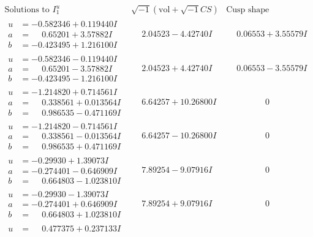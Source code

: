 \documentclass[1p]{elsarticle_modified}
\theoremstyle{definition}
\newcommand{\I}{\sqrt{-1}}
\begin{document}
$$\begin{array}{c|c|c}
\text{Solutions to }I^u_{1}& \I (\text{vol} + \sqrt{-1}CS) & \text{Cusp shape}\\
 \hline 
\begin{aligned}
u &= -0.582346 + 0.119440 I \\
a &= \phantom{-}0.65201 + 3.57882 I \\
b &= -0.423495 + 1.216100 I\end{aligned}
 & \phantom{-}2.04523 - 4.42740 I & \phantom{-}0.06553 + 3.55579 I \\ \hline\begin{aligned}
u &= -0.582346 - 0.119440 I \\
a &= \phantom{-}0.65201 - 3.57882 I \\
b &= -0.423495 - 1.216100 I\end{aligned}
 & \phantom{-}2.04523 + 4.42740 I & \phantom{-}0.06553 - 3.55579 I \\ \hline\begin{aligned}
u &= -1.214820 + 0.714561 I \\
a &= \phantom{-}0.338561 + 0.013564 I \\
b &= \phantom{-}0.986535 - 0.471169 I\end{aligned}
 & \phantom{-}6.64257 + 10.26800 I & \phantom{-0.000000 } 0 \\ \hline\begin{aligned}
u &= -1.214820 - 0.714561 I \\
a &= \phantom{-}0.338561 - 0.013564 I \\
b &= \phantom{-}0.986535 + 0.471169 I\end{aligned}
 & \phantom{-}6.64257 - 10.26800 I & \phantom{-0.000000 } 0 \\ \hline\begin{aligned}
u &= -0.29930 + 1.39073 I \\
a &= -0.274401 - 0.646909 I \\
b &= \phantom{-}0.664803 - 1.023810 I\end{aligned}
 & \phantom{-}7.89254 - 9.07916 I & \phantom{-0.000000 } 0 \\ \hline\begin{aligned}
u &= -0.29930 - 1.39073 I \\
a &= -0.274401 + 0.646909 I \\
b &= \phantom{-}0.664803 + 1.023810 I\end{aligned}
 & \phantom{-}7.89254 + 9.07916 I & \phantom{-0.000000 } 0 \\ \hline\begin{aligned}
u &= \phantom{-}0.477375 + 0.237133 I \\

\end{aligned}
\end{array}$$
\end{document}
